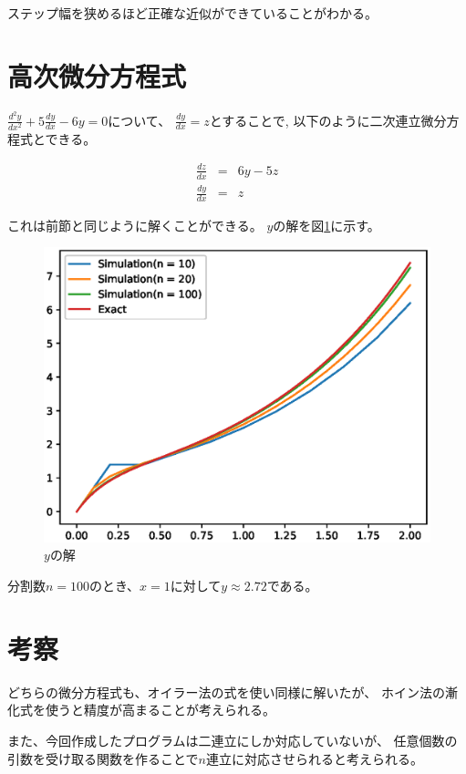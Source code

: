 \documentclass{jsarticle}
\begin{document}
        ステップ幅を狭めるほど正確な近似ができていることがわかる。

    \section{高次微分方程式}
        $\displaystyle\frac{d^2y}{dx^2}+5\frac{dy}{dx}-6y=0$について、
        $\displaystyle\frac{dy}{dx}=z$とすることで,
        以下のように二次連立微分方程式とできる。

        \begin{eqnarray}
            \frac{dz}{dx} &=& 6y-5z \nonumber \\
            \frac{dy}{dx} &=& z \nonumber
        \end{eqnarray}

        これは前節と同じように解くことができる。
        $y$の解を図\ref{fig:high}に示す。

        \begin{figure}[h]
            \centering
            \includegraphics[width=0.8\hsize]{img/y2.eps}
            \caption{$y$の解}
            \label{fig:high}
        \end{figure}

        分割数$n=100$のとき、$x=1$に対して$y\approx 2.72$である。

    \section{考察}
        どちらの微分方程式も、オイラー法の式を使い同様に解いたが、
        ホイン法の漸化式を使うと精度が高まることが考えられる。

        また、今回作成したプログラムは二連立にしか対応していないが、
        任意個数の引数を受け取る関数を作ることで$n$連立に対応させられると考えられる。
\end{document}
